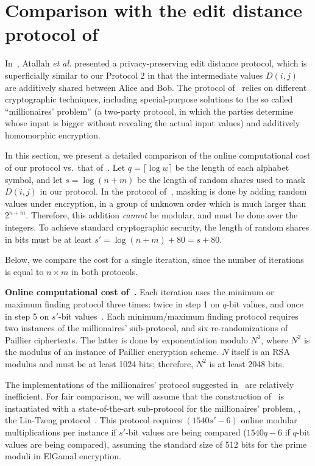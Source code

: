 
\section{Comparison with the edit distance protocol of~\cite{atallah}}
\label{appendix-atallah}

In~\cite{atallah}, Atallah \emph{et al.} presented a privacy-preserving
edit distance protocol, which is superficially similar to our Protocol 2
in that the intermediate values $D(i,j)$ are additively shared between
Alice and Bob.  The protocol of~\cite{atallah} relies on different
cryptographic techniques, including special-purpose solutions to the so
called ``millionaires' problem'' (a two-party protocol, in which the
parties determine whose input is bigger without revealing the actual
input values) and additively homomorphic encryption.

In this section, we present a detailed comparison of the online
computational cost of our protocol vs.\ that of~\cite{atallah}.  Let $q
= \lceil \log w \rceil$ be the length of each alphabet symbol, and
let $s=\log(n+m)$ be the length of random shares used to mask $D(i,j)$
in our protocol.  In the protocol of~\cite{atallah}, masking is done by
adding random values under encryption, in a group of unknown order which
is much larger than $2^{n+m}$.  Therefore, this addition \emph{cannot}
be modular, and must be done over the integers.  To achieve standard
cryptographic security, the length of random shares in bits must be at
least $s'=\log(n+m)+80=s+80$.

Below, we compare the cost for a single iteration, since the number of
iterations is equal to $n \times m$ in both protocols.

\vspace{1ex}
\noindent
\textbf{Online computational cost of~\cite{atallah}.}
Each iteration uses the minimum or maximum finding protocol three times:
twice in step 1 on $q$-bit values, and once in step 5 on $s'$-bit
values~\cite[section 4.1]{atallah}.  Each minimum/maximum finding
protocol requires two instances of the millionaires' sub-protocol, and
six re-randomizations of Paillier ciphertexts.  The latter is done by
exponentiation modulo $N^2$, where $N^2$ is the modulus of an instance
of Paillier encryption scheme.  $N$ itself is an RSA modulus and must
be at least 1024 bits; therefore, $N^2$ is at least 2048 bits.

The implementations of the millionaires' protocol suggested
in~\cite{atallah} are relatively inefficient.  For fair comparison,
we will assume that the construction of~\cite{atallah} is instantiated
with a state-of-the-art sub-protocol for the millionaires' problem, \eg,
the Lin-Tzeng protocol~\cite{lintzeng-acns05}.  This protocol requires
$(1540 s' - 6)$ online modular multiplications per instance if $s'$-bit
values are being compared ($1540 q - 6$ if $q$-bit values are being
compared), assuming the standard size of 512 bits for the prime moduli
in ElGamal encryption.

